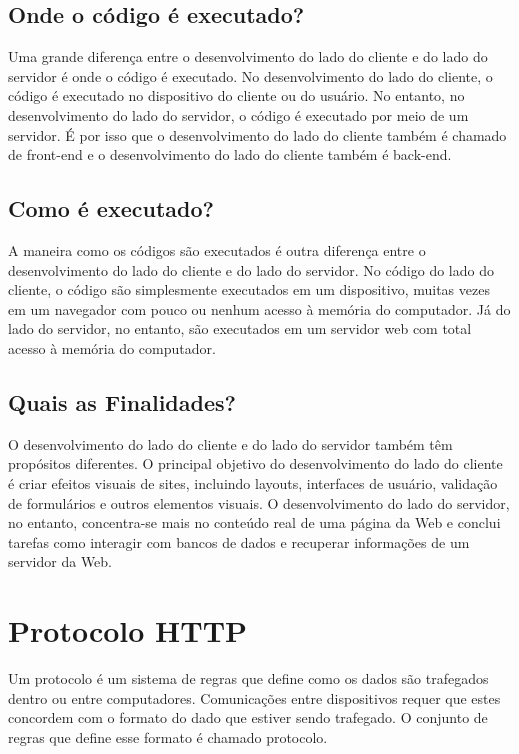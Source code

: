 \subsection{Onde o código é executado?}

Uma grande diferença entre o desenvolvimento do lado do cliente e do lado do servidor é onde o código é executado. No desenvolvimento do lado do cliente, o código é executado no dispositivo do cliente ou do usuário. No entanto, no desenvolvimento do lado do servidor, o código é executado por meio de um servidor. É por isso que o desenvolvimento do lado do cliente também é chamado de front-end e o desenvolvimento do lado do cliente também é back-end.

\subsection{Como é executado?}

A maneira como os códigos são executados é outra diferença entre o desenvolvimento do lado do cliente e do lado do servidor. No código do lado do cliente, o código são simplesmente executados em um dispositivo, muitas vezes em um navegador com pouco ou nenhum acesso à memória do computador. Já do lado do servidor, no entanto, são executados em um servidor web com total acesso à memória do computador.

\subsection{Quais as Finalidades?}

O desenvolvimento do lado do cliente e do lado do servidor também têm propósitos diferentes. O principal objetivo do desenvolvimento do lado do cliente é criar efeitos visuais de sites, incluindo layouts, interfaces de usuário, validação de formulários e outros elementos visuais. O desenvolvimento do lado do servidor, no entanto, concentra-se mais no conteúdo real de uma página da Web e conclui tarefas como interagir com bancos de dados e recuperar informações de um servidor da Web.

\section{Protocolo HTTP}

Um protocolo é um sistema de regras que define como os dados são trafegados dentro ou entre computadores. Comunicações entre dispositivos requer que estes concordem com o formato do dado que estiver sendo trafegado. O conjunto de regras que define esse formato é chamado protocolo.

